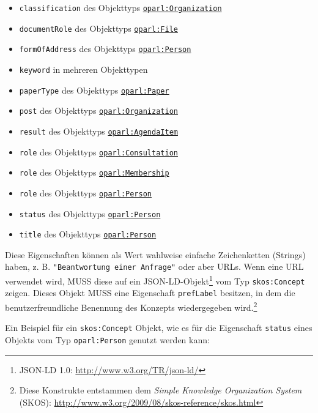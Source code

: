 \documentclass[,a4paper]{article}
\begin{document}
\begin{itemize}
\itemsep1pt\parskip0pt
\item
  \texttt{classification} des Objekttyps
  \hyperref[oparlux5forganization]{\texttt{oparl:Organization}}
\item
  \texttt{documentRole} des Objekttyps
  \hyperref[oparlux5fdocument]{\texttt{oparl:File}}
\item
  \texttt{formOfAddress} des Objekttyps
  \hyperref[oparlux5fperson]{\texttt{oparl:Person}}
\item
  \texttt{keyword} in mehreren Objekttypen
\item
  \texttt{paperType} des Objekttyps
  \hyperref[oparlux5fpaper]{\texttt{oparl:Paper}}
\item
  \texttt{post} des Objekttyps
  \hyperref[oparlux5forganization]{\texttt{oparl:Organization}}
\item
  \texttt{result} des Objekttyps
  \hyperref[oparlux5fagendaitem]{\texttt{oparl:AgendaItem}}
\item
  \texttt{role} des Objekttyps
  \hyperref[oparlux5fconsultation]{\texttt{oparl:Consultation}}
\item
  \texttt{role} des Objekttyps
  \hyperref[oparlux5fmembership]{\texttt{oparl:Membership}}
\item
  \texttt{role} des Objekttyps
  \hyperref[oparlux5fperson]{\texttt{oparl:Person}}
\item
  \texttt{status} des Objekttyps
  \hyperref[oparlux5fperson]{\texttt{oparl:Person}}
\item
  \texttt{title} des Objekttyps
  \hyperref[oparlux5fperson]{\texttt{oparl:Person}}
\end{itemize}

Diese Eigenschaften können als Wert wahlweise einfache Zeichenketten
(Strings) haben, z. B. \texttt{"Beantwortung einer Anfrage"} oder aber
URLs. Wenn eine URL verwendet wird, MUSS diese auf ein
JSON-LD-Objekt\footnote{JSON-LD 1.0: \url{http://www.w3.org/TR/json-ld/}}
vom Typ \texttt{skos:Concept} zeigen. Dieses Objekt MUSS eine
Eigenschaft \texttt{prefLabel} besitzen, in dem die benutzerfreundliche
Benennung des Konzepts wiedergegeben wird.\footnote{Diese Konstrukte
  entstammen dem \emph{Simple Knowledge Organization System} (SKOS):
  \url{http://www.w3.org/2009/08/skos-reference/skos.html}}

Ein Beispiel für ein \texttt{skos:Concept} Objekt, wie es für die
Eigenschaft \texttt{status} eines Objekts vom Typ \texttt{oparl:Person}
genutzt werden kann:
\end{document}
